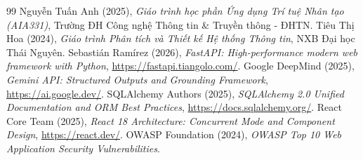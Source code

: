 \documentclass[12pt,a4paper,oneside]{report}
\begin{document}
\begin{thebibliography}{99}
 Nguyễn Tuấn Anh (2025), \textit{Giáo trình học phần Ứng dụng Trí tuệ Nhân tạo (AIA331)}, Trường ĐH Công nghệ Thông tin \& Truyền thông - ĐHTN.
 Tiêu Thị Hoa (2024), \textit{Giáo trình Phân tích và Thiết kế Hệ thống Thông tin}, NXB Đại học Thái Nguyên.
 Sebastián Ramírez (2026), \textit{FastAPI: High-performance modern web framework with Python}, \url{https://fastapi.tiangolo.com/}.
 Google DeepMind (2025), \textit{Gemini API: Structured Outputs and Grounding Framework}, \url{https://ai.google.dev/}.
 SQLAlchemy Authors (2025), \textit{SQLAlchemy 2.0 Unified Documentation and ORM Best Practices}, \url{https://docs.sqlalchemy.org/}.
 React Core Team (2025), \textit{React 18 Architecture: Concurrent Mode and Component Design}, \url{https://react.dev/}.
 OWASP Foundation (2024), \textit{OWASP Top 10 Web Application Security Vulnerabilities}.
\end{thebibliography}
\end{document}
